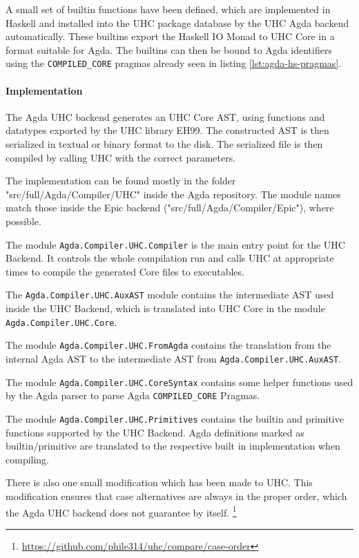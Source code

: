 \documentclass[12pt, a4paper, twoside]{report}
\begin{document}
A small set of builtin functions have been defined, which are implemented in Haskell
and installed into the UHC package database by the UHC Agda backend automatically. These
builtins export the Haskell IO Monad to UHC Core in a format suitable for Agda.
The builtins can then be bound to Agda identifiers using the \texttt{COMPILED_CORE} pragmas
already seen in listing \ref{lst:agda-hs-pragmas}.


\paragraph{Implementation}
The Agda UHC backend generates an UHC Core AST, using functions and datatypes exported
by the UHC library EH99. The constructed AST is then serialized in textual or binary format
to the disk. The serialized file is then compiled by calling UHC with the correct parameters.

The implementation can be found mostly in the folder "src/full/Agda/Compiler/UHC" inside
the Agda repository. The module
names match those inside the Epic backend ("src/full/Agda/Compiler/Epic"), where possible.

The module \texttt{Agda.Compiler.UHC.Compiler} is the main entry point for the UHC Backend.
It controls the whole compilation run and calls UHC at appropriate times to compile the
generated Core files to executables.

The \texttt{Agda.Compiler.UHC.AuxAST} module contains the intermediate AST used inside the UHC Backend,
which is translated into UHC Core in the module \texttt{Agda.Compiler.UHC.Core}.

The module \texttt{Agda.Compiler.UHC.FromAgda} contains the translation from the internal Agda AST
to the intermediate AST from \texttt{Agda.Compiler.UHC.AuxAST}.

The module \texttt{Agda.Compiler.UHC.CoreSyntax} contains some helper functions used by
the Agda parser to parse Agda \texttt{COMPILED_CORE} Pragmas.

The module \texttt{Agda.Compiler.UHC.Primitives} contains the builtin and primitive functions
supported by the UHC Backend. Agda definitions marked as builtin/primitive are translated
to the respective built in implementation when compiling.

There is also one small modification which has been made to UHC. This modification
ensures that case alternatives are always in the proper order, which the Agda UHC backend
does not guarantee by itself. \footnote{\url{https://github.com/phile314/uhc/compare/case-order}}
\end{document}
